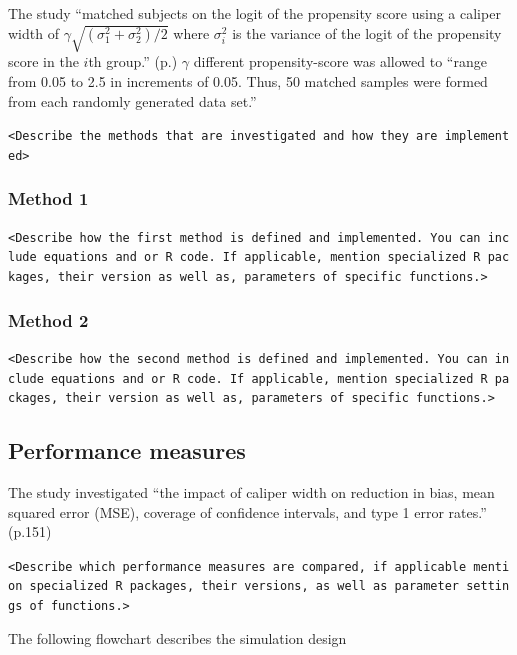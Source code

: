 \documentclass[10,a4paperpaper,]{article}
\begin{document}
The study ``matched subjects on the logit of the propensity score using
a caliper width of \(\gamma \sqrt{(\sigma_1^2 + \sigma_2^2)/2}\) where
\(\sigma_i^2\) is the variance of the logit of the propensity score in
the \(i\)th group.'' (p.) \(\gamma\) different propensity-score was
allowed to ``range from 0.05 to 2.5 in increments of 0.05. Thus, 50
matched samples were formed from each randomly generated data set.''

\texttt{\textless{}Describe\ the\ methods\ that\ are\ investigated\ and\ how\ they\ are\ implemented\textgreater{}}

\subsubsection{Method 1}

\texttt{\textless{}Describe\ how\ the\ first\ method\ is\ defined\ and\ implemented.\ You\ can\ include\ equations\ and\ or\ R\ code.\ If\ applicable,\ mention\ specialized\ R\ packages,\ their\ version\ as\ well\ as,\ parameters\ of\ specific\ functions.\textgreater{}}

\subsubsection{Method 2}

\texttt{\textless{}Describe\ how\ the\ second\ method\ is\ defined\ and\ implemented.\ You\ can\ include\ equations\ and\ or\ R\ code.\ If\ applicable,\ mention\ specialized\ R\ packages,\ their\ version\ as\ well\ as,\ parameters\ of\ specific\ functions.\textgreater{}}

\subsection{Performance measures}

The study investigated ``the impact of caliper width on reduction in
bias, mean squared error (MSE), coverage of confidence intervals, and
type 1 error rates.'' (p.151)

\texttt{\textless{}Describe\ which\ performance\ measures\ are\ compared,\ if\ applicable\ mention\ specialized\ R\ packages,\ their\ versions,\ as\ well\ as\ parameter\ settings\ of\ functions.\textgreater{}}

The following flowchart describes the simulation design
\end{document}
